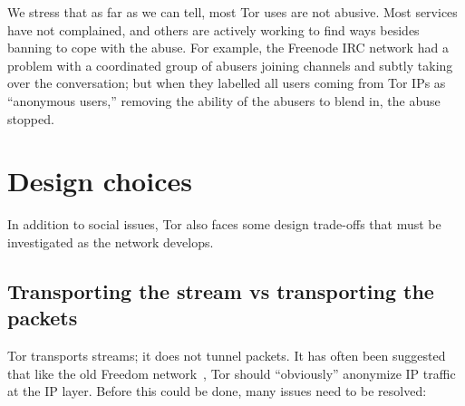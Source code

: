 \documentclass{llncs}
\begin{document}
We stress that as far as we can tell, most Tor uses are not
abusive. Most services have not complained, and others are actively
working to find ways besides banning to cope with the abuse. For example,
the Freenode IRC network had a problem with a coordinated group of
abusers joining channels and subtly taking over the conversation; but
when they labelled all users coming from Tor IPs as ``anonymous users,''
removing the ability of the abusers to blend in, the abuse stopped.



\section{Design choices}

In addition to social issues, Tor also faces some design trade-offs that must
be investigated as the network develops.

\subsection{Transporting the stream vs transporting the packets}
\label{subsec:stream-vs-packet}
\label{subsec:tcp-vs-ip}

Tor transports streams; it does not tunnel packets.
It has often been suggested that like the old Freedom
network~\cite{freedom21-security}, Tor should
``obviously'' anonymize IP traffic
at the IP layer. Before this could be done, many issues need to be resolved:
\end{document}
